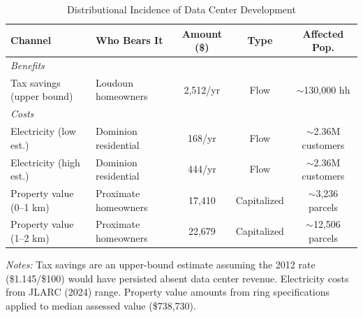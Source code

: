 \begin{table}[htbp]
\centering
\caption{Distributional Incidence of Data Center Development}
\label{tab:incidence}
\small
\begin{tabular}{llccc}
\toprule
Channel & Who Bears It & Amount (\$) & Type & Affected Pop. \\
\midrule
\multicolumn{5}{l}{\textit{Benefits}} \\
Tax savings (upper bound) & Loudoun homeowners & 2,512/yr & Flow & ${\sim}$130,000 hh \\
\midrule
\multicolumn{5}{l}{\textit{Costs}} \\
Electricity (low est.) & Dominion residential & 168/yr & Flow & ${\sim}$2.36M customers \\
Electricity (high est.) & Dominion residential & 444/yr & Flow & ${\sim}$2.36M customers \\
Property value (0--1 km) & Proximate homeowners & 17,410 & Capitalized & ${\sim}$3,236 parcels \\
Property value (1--2 km) & Proximate homeowners & 22,679 & Capitalized & ${\sim}$12,506 parcels \\
\bottomrule
\end{tabular}
\begin{tablenotes}\small
\item \textit{Notes:} Tax savings are an upper-bound estimate assuming the 2012
rate (\$1.145/\$100) would have persisted absent data center revenue.
Electricity costs from JLARC (2024) range.
Property value amounts from ring specifications applied to median assessed value
(\$738,730).
\end{tablenotes}
\end{table}
